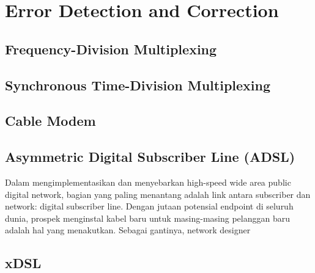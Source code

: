 \chapter{Error Detection and Correction}

\section{Frequency-Division Multiplexing}

\section{Synchronous Time-Division Multiplexing}

\section{Cable Modem}

\section{Asymmetric Digital Subscriber Line (ADSL)}

Dalam mengimplementasikan dan menyebarkan high-speed wide area public digital network, bagian yang paling menantang adalah link antara subscriber dan network: digital subscriber line. Dengan jutaan potensial endpoint di seluruh dunia, prospek menginstal kabel baru untuk masing-masing pelanggan baru adalah hal yang menakutkan. Sebagai gantinya, network designer


\section{xDSL}
